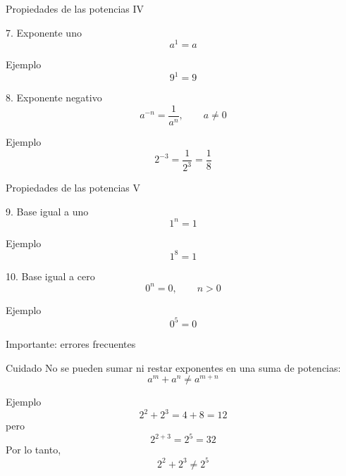 \documentclass[aspectratio=169,10pt,handout]{beamer}
\begin{document}
	\begin{frame}{Propiedades de las potencias IV}
		\begin{block}{7. Exponente uno}
			\[
			a^1 = a
			\]
		\end{block}
		
		\begin{exampleblock}{Ejemplo}
			\[
			9^1 = 9
			\]
		\end{exampleblock}
		
		\pause
		
		\begin{block}{8. Exponente negativo}
			\[
			a^{-n}=\frac{1}{a^n}, \qquad a\neq 0
			\]
		\end{block}
		
		\begin{exampleblock}{Ejemplo}
			\[
			2^{-3}=\frac{1}{2^3}=\frac{1}{8}
			\]
		\end{exampleblock}
	\end{frame}
	
	\begin{frame}{Propiedades de las potencias V}
		\begin{block}{9. Base igual a uno}
			\[
			1^n = 1
			\]
		\end{block}
		
		\begin{exampleblock}{Ejemplo}
			\[
			1^8 = 1
			\]
		\end{exampleblock}
		
		\pause
		
		\begin{block}{10. Base igual a cero}
			\[
			0^n = 0, \qquad n>0
			\]
		\end{block}
		
		\begin{exampleblock}{Ejemplo}
			\[
			0^5 = 0
			\]
		\end{exampleblock}
	\end{frame}
	
	\begin{frame}{Importante: errores frecuentes}
		\begin{alertblock}{Cuidado}
			No se pueden sumar ni restar exponentes en una suma de potencias:
			\[
			a^m + a^n \neq a^{m+n}
			\]
		\end{alertblock}
		
		\pause
		
		\begin{exampleblock}{Ejemplo}
			\[
			2^2 + 2^3 = 4 + 8 = 12
			\]
			pero
			\[
			2^{2+3}=2^5=32
			\]
			Por lo tanto,
			\[
			2^2 + 2^3 \neq 2^5
			\]
		\end{exampleblock}
	\end{frame}
	
\end{document}
